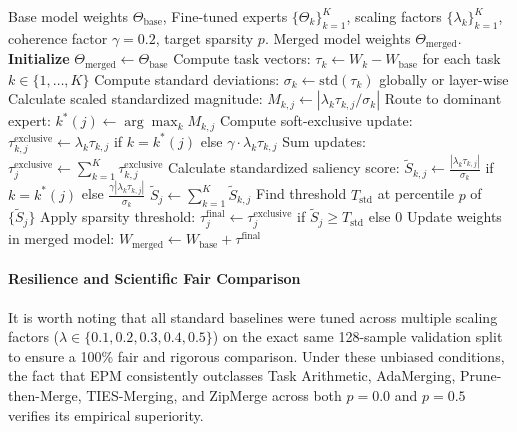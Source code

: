 \begin{algorithm}[htbp]
\caption{Soft-EPA Routing for Decoder-Only LLMs}
\label{alg:soft_epa_llm}
\begin{algorithmic}[1]
\REQUIRE Base model weights $\Theta_{\text{base}}$, Fine-tuned experts $\{\Theta_k\}_{k=1}^K$, scaling factors $\{\lambda_k\}_{k=1}^K$, coherence factor $\gamma = 0.2$, target sparsity $p$.
\ENSURE Merged model weights $\Theta_{\text{merged}}$.
\STATE \textbf{Initialize} $\Theta_{\text{merged}} \leftarrow \Theta_{\text{base}}$
  \STATE Compute task vectors: $\tau_{k} \leftarrow W_k - W_{\text{base}}$ for each task $k \in \{1, \dots, K\}$
  \STATE Compute standard deviations: $\sigma_k \leftarrow \text{std}(\tau_k)$ globally or layer-wise
    \STATE Calculate scaled standardized magnitude: $M_{k, j} \leftarrow |\lambda_k \tau_{k, j} / \sigma_k|$
    \STATE Route to dominant expert: $k^*(j) \leftarrow \arg\max_{k} M_{k, j}$
    \STATE Compute soft-exclusive update:
    \STATE \quad $\tau^{\text{exclusive}}_{k, j} \leftarrow \lambda_k \tau_{k, j}$ if $k = k^*(j)$ else $\gamma \cdot \lambda_k \tau_{k, j}$
    \STATE Sum updates: $\tau^{\text{exclusive}}_j \leftarrow \sum_{k=1}^K \tau^{\text{exclusive}}_{k, j}$
    \STATE Calculate standardized saliency score:
    \STATE \quad $\tilde{S}_{k, j} \leftarrow \frac{|\lambda_k \tau_{k, j}|}{\sigma_k}$ if $k = k^*(j)$ else $\frac{\gamma |\lambda_k \tau_{k, j}|}{\sigma_k}$
    \STATE \quad $\tilde{S}_j \leftarrow \sum_{k=1}^K \tilde{S}_{k, j}$
  \ENDFOR
  \STATE Find threshold $T_{\text{std}}$ at percentile $p$ of $\{\tilde{S}_j\}$
    \STATE Apply sparsity threshold: $\tau^{\text{final}}_j \leftarrow \tau^{\text{exclusive}}_j$ if $\tilde{S}_j \ge T_{\text{std}}$ else $0$
  \ENDFOR
  \STATE Update weights in merged model: $W_{\text{merged}} \leftarrow W_{\text{base}} + \tau^{\text{final}}$
\ENDFOR
\end{algorithmic}
\end{algorithm}

\paragraph{Resilience and Scientific Fair Comparison}
It is worth noting that all standard baselines were tuned across multiple scaling factors ($\lambda \in \{0.1, 0.2, 0.3, 0.4, 0.5\}$) on the exact same 128-sample validation split to ensure a 100\% fair and rigorous comparison. Under these unbiased conditions, the fact that EPM consistently outclasses Task Arithmetic, AdaMerging, Prune-then-Merge, TIES-Merging, and ZipMerge across both $p=0.0$ and $p=0.5$ verifies its empirical superiority.

